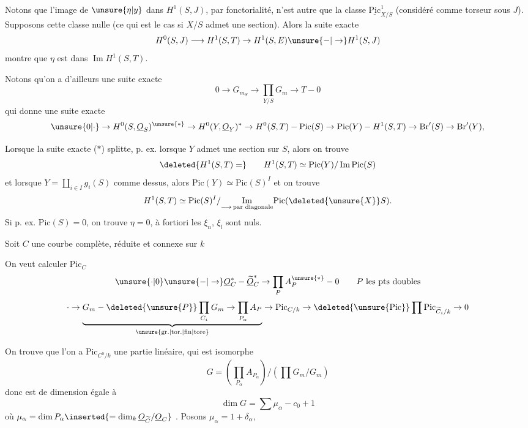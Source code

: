 Notons que l'image de $\unsure{\eta|y}$ dans $H^1(S,J)$, par fonctorialité, n'est autre que la classe  $\underline{\mathrm{Pic}}^1_{X/S}$ (considéré comme torseur sous $J$). Supposons cette classe nulle (ce qui est le cas si $X/S$ admet une section).  Alors la suite exacte
\[
H^0(S,J)\longrightarrow H^1(S,T)\to H^1(S,E)\unsure{-|\to}H^1(S,J)
\]
montre que  $\eta$ est dans $\operatorname{Im}H^1(S,T)$.

Notons qu'on a d'ailleurs une suite exacte 
\[
0\to G_{m_S}\to\prod_{Y/S}G_m\to T-0 \tag*{($*$)}
\]
qui donne une suite exacte 
\[
\unsure{0|\cdot}\to H^0(S,\underline O_S)^{\unsure{*}}\to H^0(Y,\underline O_Y)^{*}\to H^0(S,T)-\mathrm{Pic}(S)\to\mathrm{Pic}(Y)-H^1(S,T)\to\mathrm{Br}'(S)\to\mathrm{Br}'(Y),
\]

Lorsque la suite exacte ($*$) splitte, p. ex. lorsque $Y$ admet une section sur $S$, alors on trouve
\[
\deleted{H^1(S,T)=}\qquad H^1(S,T)\simeq\mathrm{Pic}(Y)/\operatorname{Im}\mathrm{Pic}(S)
\]
et lorsque $Y=\coprod_{i\in I} g_i(S)$ comme dessus, alors  $\mathrm{Pic}(Y)\simeq\mathrm{Pic}(S)^I$ et on trouve
\[
H^1(S,T)\simeq\mathrm{Pic}(S)^I/\underset{\longrightarrow\,\text{par diagonale}}{\operatorname{Im}}\mathrm{Pic}(\deleted{\unsure{X}}S).
\]
Si p. ex. $\mathrm{Pic}(S)=0$, on trouve $\eta=0$, à fortiori les $\xi_n$, $\xi_l$ sont nuls.

Soit $C$ une courbe complète, réduite et connexe sur $k$ 

On veut calculer $\mathrm{Pic}_C$
\[
\unsure{\cdot|0}\unsure{-|\to}\underline O_C^{*}-\underline{\widetilde O}_C^{*}\to\prod_P A_P^{\unsure{*}}-0\qquad P\ \text{les pts doubles}
\]
\[
\cdot\to\underbrace{G_m-\deleted{\unsure{P}}\prod_{C_i}G_m\to\prod_{P_\alpha}A_P}_{\text{\unsure{gr.|tor.|fin|tore}}}\to\mathrm{Pic}_{C/k}\to\deleted{\unsure{\mathrm{Pic}}}\prod\mathrm{Pic}_{\widetilde C_i/k}\to0
\]

On trouve que l'on a  $\mathrm{Pic}_{C^{0}/k}$ une partie linéaire,  qui est isomorphe 
\[
G=\left(\prod_{P_\alpha}A_{P_\alpha}\right)\big/\left(\prod G_m/G_m\right)
\]
donc est de dimension égale à
\[
\dim G=\sum\mu_\alpha-c_0+1
\]
où $\mu_\alpha=\dim P_\alpha\inserted{=\dim_k\underline O_{\widetilde C}/\underline O_C}$ . Posons $\mu_\alpha=1+\delta_\alpha$, 

